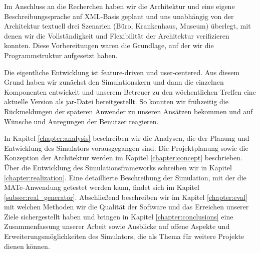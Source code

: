 Im Anschluss an die Recherchen haben wir die Architektur und eine eigene Beschreibungssprache auf XML-Basis geplant und uns unabhängig von der Architektur textuell drei Szenarien (Büro, Krankenhaus, Museum) überlegt, mit denen wir die Vollständigkeit und Flexibilität der Architektur verifizieren konnten. Diese Vorbereitungen waren die Grundlage, auf der wir die Programmstruktur aufgesetzt haben.

Die eigentliche Entwicklung ist feature-driven und user-centered. Aus diesem Grund haben wir zunächst den Simulationskern und dann die einzelnen Komponenten entwickelt und unserem Betreuer zu den wöchentlichen Treffen eine aktuelle Version als jar-Datei bereitgestellt. So konnten wir frühzeitig die Rückmeldungen der späteren Anwender zu unseren Ansätzen bekommen und auf Wünsche und Anregungen der Benutzer reagieren.



In Kapitel \ref{chapter:analysis} beschreiben wir die Analysen, die der Planung und Entwicklung des Simulators vorausgegangen sind.
Die Projektplanung sowie die Konzeption der Architektur werden im Kapitel \ref{chapter:concept} beschrieben.
Über die Entwicklung des Simulationsframeworks schreiben wir in Kapitel \ref{chapter:realization}.
Eine detaillierte Beschreibung der Simulation, mit der die MATe-Anwendung getestet werden kann, findet sich im Kapitel \ref{subsec:real_generator}.
Abschließend beschreiben wir im Kapitel \ref{chapter:eval} mit welchen Methoden wir die Qualität der Software und das Erreichen unserer Ziele sichergestellt haben und bringen in Kapitel \ref{chapter:conclusions} eine Zusammenfassung unserer Arbeit sowie Ausblicke auf offene Aspekte und Erweiterungsmöglichkeiten des Simulators, die als Thema für weitere Projekte dienen können.


